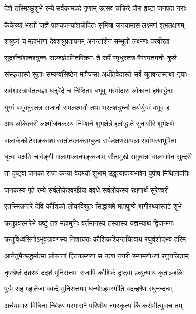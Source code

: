 \twolineshloka
{देशे तस्मिञ्छुशुभे रम्ये सर्वकामप्रदे नृणाम्}
{उत्सवं चक्रिरे पौरा हृष्टा जनपदा नराः}%

\twolineshloka
{कैकेय्यां भरतो जज्ञे पाञ्चजन्यांशचोदितः}
{सुमित्रा जनयामास लक्ष्मणं शुभलक्षणम्}%

\twolineshloka
{शत्रुघ्नं च महाभागा देवशत्रुप्रतापनम्}
{अनन्तांशेन सम्भूतो लक्ष्मणः परवीरहा}%

\twolineshloka
{सुदर्शनांशाच्छत्रुघ्नः सञ्जज्ञेऽमितविक्रमः}
{ते सर्वे ववृधुस्तत्र वैवस्वतमनोः कुले}%

\twolineshloka
{संस्कृतास्ते सुताः सम्यग्वसिष्ठेन महौजसा}
{अधीतवेदास्ते सर्वे श्रुतवन्तस्तथा नृपाः}%

\twolineshloka
{सर्वशास्त्रार्थतत्वज्ञा धनुर्वेदे च निष्ठिताः}
{बभूवुः परमोदारा लोकानां हर्षवर्द्धनाः}%

\twolineshloka
{युग्मं बभूवतुस्तत्र राजानौ रामलक्ष्मणौ}
{तथा भरतशत्रुघ्नौ तयोर्युग्मं बभूव ह}%

\twolineshloka
{अथ लोकेश्वरी लक्ष्मीर्जनकस्य निवेशने}
{शुभक्षेत्रे हलोद्धाते सुनासीरे शुभेक्षणे}%

\twolineshloka
{बालार्ककोटिसङ्काशा रक्तोत्पलकराम्बुजा}
{सर्वलक्षणसम्पन्ना सर्वाभरणभूषिता}%

\twolineshloka
{धृत्वा वक्षसि चार्वङ्गी मालामम्लानपङ्कजाम्}
{सीतामुखे समुत्पन्ना बालभावेन सुन्दरी}%

\twolineshloka
{तां दृष्ट्वा जनको राजा कन्यां वेदमयीं शुभाम्}
{उद्धृत्यापत्यभावेन पुपोष मिथिलापतिः}%

\twolineshloka
{जनकस्य गृहे रम्ये सर्वलोकेश्वरप्रिया}
{ववृधे सर्वलोकस्य रक्षणार्थं सुरेश्वरी}%

\twolineshloka
{एतस्मिन्नन्तरे देवि कौशिको लोकविश्रुतः}
{सिद्धाश्रमे महापुण्ये भागीरथ्यास्तटे शुभे}%

\twolineshloka
{क्रतुप्रवरमारेभे यष्टुं तत्र महामुनिः}
{वर्त्तमानस्य तस्यास्य यज्ञस्याथ द्विजन्मनः}%

\twolineshloka
{क्रतुविध्वंसिनोऽभूवन्रावणस्य निशाचराः}
{कौशिकश्चिन्तयित्वाथ रघुवंशोद्भवं हरिम्}%

\twolineshloka
{आनेतुमैच्छद्धर्मात्मा लोकानां हितकाम्यया}
{स गत्वा नगरीं रम्यामयोध्यां रघुपालिताम्}%

\twolineshloka
{नृपश्रेष्ठं दशरथं ददर्श मुनिसत्तमः}
{राजापि कौशिकं दृष्ट्वा प्रत्युत्थाय कृताञ्जलिः}%

\twolineshloka
{पुत्रैः सह महातेजा ववन्दे मुनिसत्तमम्}
{धन्योऽहमस्मीति वदन्हर्षेण रघुनन्दनम्}%

\twolineshloka
{अर्चयामास विधिना निवेश्य परमासने}
{परिणीय नमस्कृत्य किं करोमीत्युवाच तम्}%

